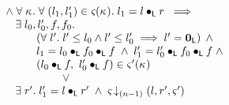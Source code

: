 \begin{definition}
\[\begin{array}{l}
  \hspace*{0.2cm}\land\;\for{\ca{}} \for{(l_1, l'_1) \in \amod{}(\ca{})} l_1 = l \composeL r \;\implies\\
  \hspace*{0.5cm}\exsts{l_0, l'_0, f, f_0} \nonumber\\
  \hspace*{1cm}
  \begin{array}{l}
  	\left(\for{l'} l' \leq l_0 \land l' \leq l'_0 \implies l' = \unitL\right)\;\land\\
  	l_1 = l_0 \composeL f_0 \composeL f \;\land\; l'_1 = l'_0 \composeL f_0 \composeL f  \;\land\\
  	(l_0 \composeL f,\ l'_0 \composeL f) \in \amod{}'(\ca{}) 
  \end{array} \\
%
	\hspace*{2cm}\lor  \nonumber\\
	\hspace*{0.5cm}\exsts{r'} l'_1 = l \composeL r' \;\land\; \extendsAMUpto{\amod}{(n-1)}{l}{r'}{\amod{}'}
  \\\\
\end{array}
%
%	
\]
\end{definition}
